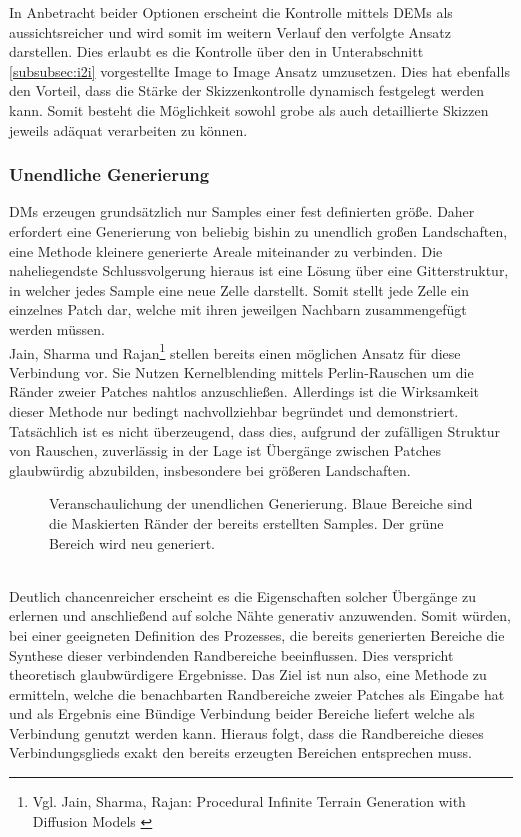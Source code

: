 In Anbetracht beider Optionen erscheint die Kontrolle mittels \ac{DEM}s als aussichtsreicher und wird somit im weitern Verlauf den verfolgte Ansatz darstellen. Dies erlaubt es die Kontrolle über den in Unterabschnitt \ref{subsubsec:i2i} vorgestellte Image to Image Ansatz umzusetzen. Dies hat ebenfalls den Vorteil, dass die Stärke der Skizzenkontrolle dynamisch festgelegt werden kann. Somit besteht die Möglichkeit sowohl grobe als auch detaillierte Skizzen jeweils adäquat verarbeiten zu können. 

\subsubsection {Unendliche Generierung}

\ac{DM}s erzeugen grundsätzlich nur Samples einer fest definierten größe. Daher erfordert eine Generierung von beliebig bishin zu unendlich großen Landschaften, eine Methode kleinere generierte Areale miteinander zu verbinden. Die naheliegendste Schlussvolgerung hieraus ist eine Lösung über eine Gitterstruktur, in welcher jedes Sample eine neue Zelle darstellt. Somit stellt jede Zelle ein einzelnes Patch dar, welche mit ihren jeweilgen Nachbarn zusammengefügt werden müssen. \\
Jain, Sharma und Rajan\footnote{
    Vgl. Jain, Sharma, Rajan: Procedural Infinite Terrain Generation with Diffusion Models
    \cite{jain2022adaptive}
} stellen bereits einen möglichen Ansatz für diese Verbindung vor. Sie Nutzen Kernelblending mittels Perlin-Rauschen um die Ränder zweier Patches nahtlos anzuschließen. Allerdings ist die Wirksamkeit dieser Methode nur bedingt nachvollziehbar begründet und demonstriert. Tatsächlich ist es nicht überzeugend, dass dies, aufgrund der zufälligen Struktur von Rauschen, zuverlässig in der Lage ist Übergänge zwischen Patches glaubwürdig abzubilden, insbesondere bei größeren Landschaften.
\begin{figure}[htbp]
    \centering
    \caption{Veranschaulichung der unendlichen Generierung. Blaue Bereiche sind die Maskierten Ränder der bereits erstellten Samples. Der grüne Bereich wird neu generiert.}
    \label{fig:inf_naive}
\end{figure} \\
Deutlich chancenreicher erscheint es die Eigenschaften solcher Übergänge zu erlernen und anschließend auf solche Nähte generativ anzuwenden. Somit würden, bei einer geeigneten Definition des Prozesses, die bereits generierten Bereiche die Synthese dieser verbindenden Randbereiche beeinflussen. Dies verspricht theoretisch glaubwürdigere Ergebnisse. Das Ziel ist nun also, eine Methode zu ermitteln, welche die benachbarten Randbereiche zweier Patches als Eingabe hat und als Ergebnis eine Bündige Verbindung beider Bereiche liefert welche als Verbindung genutzt werden kann. Hieraus folgt, dass die Randbereiche dieses Verbindungsglieds exakt den bereits erzeugten Bereichen entsprechen muss.
